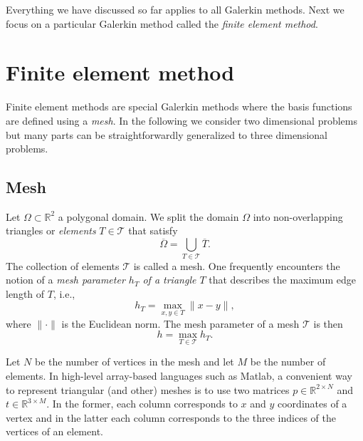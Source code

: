 \documentclass{amsart}
\theoremstyle{definition}
\begin{document}
Everything we have discussed so far applies to all Galerkin methods.
Next we focus on a particular Galerkin method called the \emph{finite
element method}.

\section{Finite element method}

Finite element methods are special Galerkin methods where the basis
functions are defined using a \emph{mesh}. In the following we
consider two dimensional problems but many parts can be
straightforwardly generalized to three dimensional problems.

\subsection{Mesh}

Let $\Omega \subset \mathbb{R}^2$ a polygonal domain. We split the
domain $\Omega$ into non-overlapping triangles or \emph{elements} $T
\in \mathcal{T}$ that satisfy
\begin{equation}
  \overline{\Omega} = \bigcup_{T \in \mathcal{T}} \overline{T}.
\end{equation}
The collection of elements $\mathcal{T}$ is called a mesh.  One
frequently encounters the notion of a \emph{mesh parameter $h_T$ of a
triangle $T$} that describes the maximum edge length of $T$, i.e.,
\begin{equation}
  h_T = \max_{x,y \in T} \|x-y\|,
\end{equation}
where $\|\cdot\|$ is the Euclidean norm. The mesh parameter of a
mesh $\mathcal{T}$ is then
\begin{equation}
  h = \max_{T \in \mathcal{T}} h_T.
\end{equation}

Let $N$ be the number of vertices in the mesh and let $M$ be the
number of elements.  In high-level array-based languages such as
Matlab, a convenient way to represent triangular (and other) meshes is
to use two matrices $p \in \mathbb{R}^{2 \times N}$ and $t \in
\mathbb{R}^{3 \times M}$. In the former, each column corresponds to
$x$ and $y$ coordinates of a vertex and in the latter each column
corresponds to the three indices of the vertices of an element.
\end{document}
